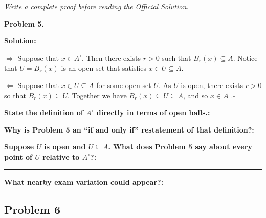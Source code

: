 \documentclass[12pt]{article}
\newcommand{\fillfield}[1]{%
  \par\noindent\textbf{#1:}\enspace\hrulefill\par\vspace{3pt}%
}
\newcommand{\fillfieldlong}[1]{%
  \par\noindent\textbf{#1:}\par\vspace{1.5cm}%
  \noindent\rule{\linewidth}{0.35pt}\par\vspace{4pt}%
}
\newcommand{\writespace}[1]{\vspace{#1}}
\begin{document}
\newpage

\begin{tcolorbox}[
  enhanced, breakable,
  colback  = pass5gray,
  colframe = black!38,
  fonttitle = \bfseries,
  title = {Pass 5 \enspace\textbf{--}\enspace Full Proof Attempt}
]
\small\itshape Write a complete proof before reading the Official Solution.\par
\normalfont\normalsize
\writespace{19cm}
\end{tcolorbox}

\newpage

\begin{tcolorbox}[
  enhanced, breakable,
  colback  = solgreen,
  colframe = green!45!black,
  fonttitle = \bfseries,
  title = {\textsc{Official Solution}\hfill Homework 8 -- Selected Solutions}
]
\textbf{Problem 5.}

\medskip\textbf{Solution:}

\medskip
$\Longrightarrow$ Suppose that $x \in A^\circ$. Then there exists $r > 0$ such that $B_r(x) \subseteq A$.
Notice that $U = B_r(x)$ is an open set that satisfies $x \in U \subseteq A$.

\medskip
$\Longleftarrow$ Suppose that $x \in U \subseteq A$ for some open set $U$. As $U$ is open, there exists $r > 0$ so
that $B_r(x) \subseteq U$. Together we have $B_r(x) \subseteq U \subseteq A$, and so $x \in A^\circ$.\hfill$\square$
\end{tcolorbox}

\bigskip

\begin{tcolorbox}[
  enhanced, breakable,
  colback  = reflectcyan,
  colframe = cyan!55!black,
  fonttitle = \bfseries,
  title = {\textsc{Reflection \& Variation}}
]
\fillfield{State the definition of $A^\circ$ directly in terms of open balls.}
\fillfield{Why is Problem 5 an ``if and only if'' restatement of that definition?}
\fillfieldlong{Suppose $U$ is open and $U\subseteq A$. What does Problem 5 say about every point of $U$ relative to $A^\circ$?}
\fillfield{What nearby exam variation could appear?}
\end{tcolorbox}

\newpage
\subsection{Problem 6}
\end{document}
